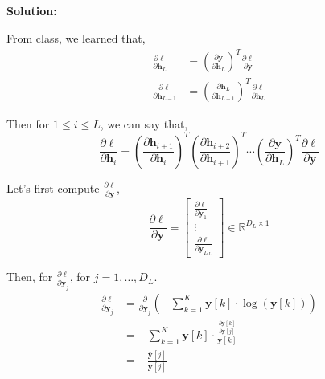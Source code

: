 \documentclass{article}
\newenvironment{solution}
  {\par\noindent\textbf{Solution:}\par}
  {\par}
\begin{document}
\subsection{}
\begin{solution}
  From class, we learned that,
  \[
    \begin{aligned}
      \frac{\partial \ell}{\partial \textbf{h}_L} &=\left( \frac{\partial \textbf{y}}{\partial \textbf{h}_L} \right)^T \frac{\partial \ell}{\partial \textbf{y}} \\ 
      \frac{\partial \ell}{\partial \textbf{h}_{L-1}} &=\left( \frac{\partial \textbf{h}_L}{\partial \textbf{h}_{L-1}} \right)^T \frac{\partial \ell}{\partial \textbf{h}_L} 
    \end{aligned}
  \]

  Then for $1 \le i \le L$, we can say that,
  $$\frac{\partial \ell}{\partial \textbf{h}_i}=\left( \frac{\partial \textbf{h}_{i+1}}{\partial \textbf{h}_{i}} \right)^T \left( \frac{\partial \textbf{h}_{i+2}}{\partial \textbf{h}_{i+1}} \right)^T \cdots \left(\frac{\partial \textbf{y}}{\partial \textbf{h}_L} \right)^T \frac{\partial \ell}{\partial \textbf{y}}$$

  Let's first compute $\frac{\partial \ell}{\partial \textbf{y}}$,
  \[
    \frac{\partial \ell}{\partial \textbf{y}} = \begin{bmatrix} \frac{\partial \ell}{\partial \textbf{y}_1} \\ \vdots \\ \frac{\partial \ell}{\partial \textbf{y}_{D_L}} \end{bmatrix} \in \mathbb{R}^{D_L \times 1} 
  \]

  Then, for $\frac{\partial \ell}{\partial \textbf{y}_j}$, for $j =1,\dots,D_L$.
  \[
    \begin{aligned}
      \frac{\partial \ell}{\partial \textbf{y}_j} &= \frac{\partial}{\partial \textbf{y}_j} \left( - \sum_{k=1}^K \bar{\textbf{y}}[k]\cdot \log(\textbf{y}[k]) \right) \\ 
                                                  &= -\sum_{k=1}^K \bar{\textbf{y}}[k] \cdot \frac{ \frac{\partial \textbf{y}[k]}{\partial \textbf{y}[j]}}{\textbf{y}[k]} \\ 
                                                  &= -\frac{\bar{\textbf{y}}[j]}{\textbf{y}[j]}
    \end{aligned}
  \]


\end{solution}
\end{document}
